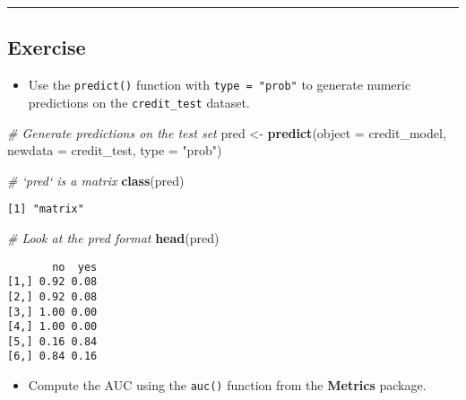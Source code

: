 \documentclass[
]{book}
\newenvironment{Shaded}{\begin{snugshade}}{\end{snugshade}}
\newcommand{\CommentTok}[1]{\textcolor[rgb]{0.56,0.35,0.01}{\textit{#1}}}
\newcommand{\DataTypeTok}[1]{\textcolor[rgb]{0.13,0.29,0.53}{#1}}
\newcommand{\DecValTok}[1]{\textcolor[rgb]{0.00,0.00,0.81}{#1}}
\newcommand{\KeywordTok}[1]{\textcolor[rgb]{0.13,0.29,0.53}{\textbf{#1}}}
\newcommand{\NormalTok}[1]{#1}
\newcommand{\OperatorTok}[1]{\textcolor[rgb]{0.81,0.36,0.00}{\textbf{#1}}}
\newcommand{\StringTok}[1]{\textcolor[rgb]{0.31,0.60,0.02}{#1}}
\providecommand{\tightlist}{%
  \setlength{\itemsep}{0pt}\setlength{\parskip}{0pt}}
\begin{document}
\begin{center}\rule{0.5\linewidth}{0.5pt}\end{center}

\hypertarget{exercise-13}{%
\subsection*{Exercise}\label{exercise-13}}

\begin{itemize}
\tightlist
\item
  Use the \texttt{predict()} function with \texttt{type\ =\ "prob"} to generate numeric predictions on the \texttt{credit\_test} dataset.
\end{itemize}

\begin{Shaded}
\begin{Highlighting}[]
\CommentTok{# Generate predictions on the test set}
\NormalTok{pred <-}\StringTok{ }\KeywordTok{predict}\NormalTok{(}\DataTypeTok{object =}\NormalTok{ credit_model,}
                \DataTypeTok{newdata =}\NormalTok{ credit_test,}
                \DataTypeTok{type =} \StringTok{"prob"}\NormalTok{)}

\CommentTok{# `pred` is a matrix}
\KeywordTok{class}\NormalTok{(pred)}
\end{Highlighting}
\end{Shaded}

\begin{verbatim}
[1] "matrix"
\end{verbatim}

\begin{Shaded}
\begin{Highlighting}[]
\CommentTok{# Look at the pred format}
\KeywordTok{head}\NormalTok{(pred)}
\end{Highlighting}
\end{Shaded}

\begin{verbatim}
       no  yes
[1,] 0.92 0.08
[2,] 0.92 0.08
[3,] 1.00 0.00
[4,] 1.00 0.00
[5,] 0.16 0.84
[6,] 0.84 0.16
\end{verbatim}

\begin{itemize}
\tightlist
\item
  Compute the AUC using the \texttt{auc()} function from the \textbf{Metrics} package.
\end{itemize}

\begin{Shaded}
\end{Shaded}
\end{document}
